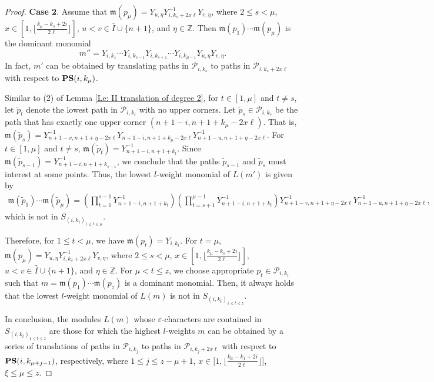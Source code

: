\documentclass[10pt,a4paper]{amsart}
\begin{document}
\begin{proof}
{\bf Case 2}. Assume that $\mathfrak{m}(p_{\mu})=Y_{u,\eta}Y_{i,k_s+2x \ell}^{-1}Y_{v,\eta}$, where $2\leq s<\mu$, $x\in[1,\lfloor\frac{k_\mu-k_s+2i}{2 \ell}\rfloor]$, $u<v \in \hat{I} \cup \{n+1\}$, and $\eta\in \mathbb{Z}$. Then $\mathfrak{m}(p_1)\cdots \mathfrak{m}(p_{\mu})$ is the dominant monomial
\[
m''=Y_{i,k_{1}}\cdots Y_{i,k_{s-1}}Y_{i,k_{s+1}}\cdots Y_{i,k_{\mu-1}} Y_{u,\eta}Y_{v,\eta}.
\]
In fact, $m'$ can be obtained by translating paths in $\mathscr{P}_{i,k_s}$ to paths in $\mathscr{P}_{i,k_s+2x \ell}$ with respect to ${\bf PS}(i,k_{\mu})$.


Similar to (2) of Lemma \ref{Le: II translation of degree 2}, for $t\in [1,\mu]$ and $t\neq s$, let $\widetilde{p}_t$ denote the lowest path in $\mathscr{P}_{i,k_t}$ with no upper corners. Let $\widetilde{p}_{s}\in \mathscr{P}_{i,k_{s}}$ be the path that has exactly one upper corner $(n+1-i,n+1+k_{\mu}-2x\ell)$. That is, $\mathfrak{m}(\widetilde{p}_{s})= Y_{n+1-v,n+1+\eta-2x \ell}^{-1}Y_{n+1-i,n+1+k_\mu -2x \ell} Y_{n+1-u,n+1+\eta-2x \ell}^{-1}$. For $t\in[1, \mu]$ and $t\neq s$, $\mathfrak{m}(\widetilde{p}_{t})=Y_{n+1-i,n+1+k_t}^{-1}$. Since $\mathfrak{m}(\widetilde{p}_{s-1})=Y_{n+1-i,n+1+k_{s-1}}^{-1}$, we conclude that the paths $\widetilde{p}_{s-1}$ and $\widetilde{p}_{s}$ must interest at some points. Thus, the lowest $l$-weight monomial of $L(m')$ is given by
\begin{align*}
 \mathfrak{m}(\widetilde{p}_{1})\cdots \mathfrak{m}(\widetilde{p}_{\mu})=\left( \prod_{t=1}^{s-1} Y_{n+1-i,n+1+k_{t}}^{-1} \right) \left( \prod_{t=s+1}^{\mu-1}Y_{n+1-i,n+1+k_{t}}^{-1} \right) Y_{n+1-v,n+1+\eta-2x \ell}^{-1} Y_{n+1-u,n+1+\eta-2x \ell}^{-1},
\end{align*}
which is not in $S_{(i,k_t)_{1 \leq t \leq \mu}}$.

Therefore, for $1\leq t<\mu$, we have $\mathfrak{m}(p_t)=Y_{i,k_t}$. For $t=\mu$, $\mathfrak{m}(p_{\mu})=Y_{u,\eta}Y_{i,k_s+2x \ell}^{-1}Y_{v,\eta}$, where $2\leq s<\mu$, $x\in[1,\lfloor\frac{k_\mu-k_s+2i}{2 \ell}\rfloor]$, $u<v \in \hat{I} \cup \{n+1\}$, and $\eta\in \mathbb{Z}$. For $\mu<t\leq z$, we choose appropriate $p_t\in\mathscr{P}_{i,k_t}$ such that $m=\mathfrak{m}(p_1)\cdots \mathfrak{m}(p_z)$ is a dominant monomial. Then, it always holds that the lowest $l$-weight monomial of $L(m)$ is not in $S_{(i,k_t)_{1 \leq t \leq z}}$.

In conclusion, the modules $L(m)$ whose $\varepsilon$-characters are contained in $S_{(i,k_t)_{1 \leq t \leq z}}$ are those for which the highest $l$-weights $m$ can be obtained by a series of translations of paths in $\mathscr{P}_{i,k_j}$ to paths in $\mathscr{P}_{i,k_j+2x \ell}$ with respect to ${\bf PS}(i,k_{\mu+j-1})$, respectively, where $1\leq j\leq z-\mu+1$, $x\in [1,\lfloor\frac{k_\mu-k_1+2i}{2 \ell}\rfloor$], $\xi \leq \mu\leq z$.

\end{proof}
\end{document}
